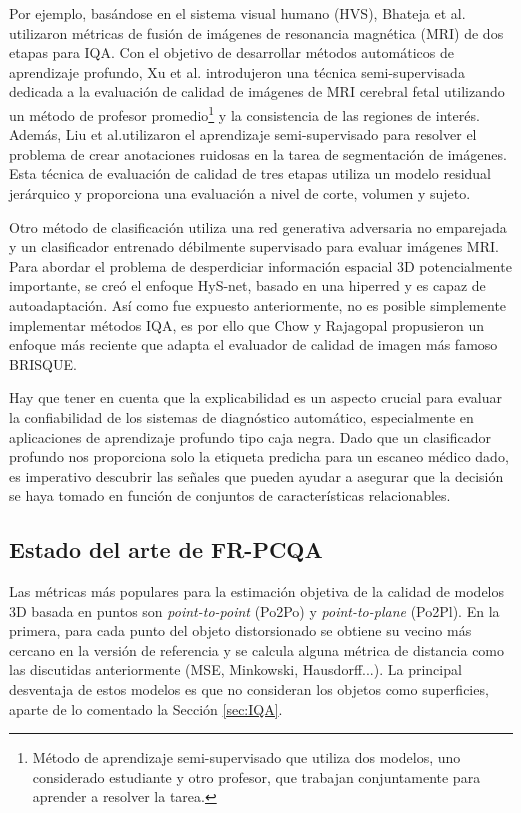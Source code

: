 Por ejemplo, basándose en el sistema visual humano (HVS), 
Bhateja et al.\cite{MultiModalMRIFusionMethod} utilizaron métricas de fusión
de imágenes de resonancia magnética (MRI) de dos etapas para IQA.
Con el objetivo de desarrollar métodos automáticos de aprendizaje profundo,
Xu et al.\cite{SemiSupervisedMRIFetalBrain} introdujeron una técnica semi-supervisada dedicada a la evaluación de 
calidad de imágenes de MRI cerebral fetal utilizando un método de 
profesor promedio\footnote{
Método de aprendizaje semi-supervisado que utiliza dos modelos, 
uno considerado estudiante y otro profesor, que trabajan conjuntamente para aprender
a resolver la tarea.
} y la consistencia de las regiones de interés. 
Además, Liu et al.\cite{IQAForPediatricMRIWithNoisySegmentation}utilizaron el aprendizaje semi-supervisado para resolver 
el problema de crear anotaciones ruidosas en la tarea de segmentación de imágenes. 
Esta técnica de evaluación de calidad de tres etapas utiliza un modelo residual 
jerárquico y proporciona una evaluación a nivel de corte, volumen y sujeto. 

Otro método de clasificación utiliza una red generativa adversaria no emparejada 
y un clasificador entrenado débilmente supervisado para evaluar imágenes MRI\cite{MIGAN}.
Para abordar el problema de desperdiciar información espacial 3D potencialmente importante, 
se creó el enfoque HyS-net\cite{Hys-net}, basado en una hiperred y es capaz de 
autoadaptación\cite{Hys-net}. Así como fue expuesto anteriormente, no es posible 
simplemente implementar métodos IQA, es por ello que Chow y Rajagopal \cite{MedicalBRISQUE} 
propusieron un enfoque más reciente que adapta el evaluador de calidad de imagen más famoso BRISQUE\cite{BRISQUE}.

Hay que tener en cuenta que la explicabilidad es un aspecto crucial 
para evaluar la confiabilidad de los sistemas de diagnóstico automático, 
especialmente en aplicaciones de aprendizaje profundo tipo caja negra. 
Dado que un clasificador profundo nos proporciona solo la etiqueta predicha 
para un escaneo médico dado, es imperativo descubrir las señales que pueden 
ayudar a asegurar que la decisión se haya tomado en función de conjuntos de 
características relacionables.

\subsection{Estado del arte de FR-PCQA}
Las métricas más populares para la estimación objetiva de la calidad de modelos 
3D basada en puntos son \emph{point-to-point} (Po2Po)\cite{PointToPoint} y
\emph{point-to-plane} (Po2Pl)\cite{PointToPlane}. 
En la primera, para cada punto del objeto distorsionado se obtiene su vecino más cercano en la versión de referencia y 
se calcula alguna métrica de distancia como las discutidas anteriormente (MSE, Minkowski, Hausdorff...). 
La principal desventaja de estos modelos es que no consideran los objetos como 
superficies, aparte de lo comentado la Sección \ref{sec:IQA}.

